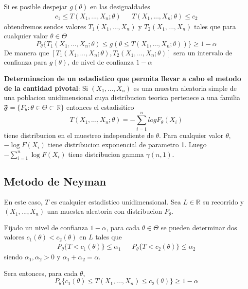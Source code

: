 \documentclass[10pt]{extarticle}
\newcommand{\R}{\mathbb{R}}
\newcommand{\<}{\langle}
\renewcommand{\>}{\rangle}
\theoremstyle{definition}
\begin{document}
Si es posible despejar $g(\theta)$ en las desigualdades
\begin{align*}
  c_1 \leq T(X_1,..., X_n; \theta) &  & T(X_1,..., X_n; \theta) \leq c_2
\end{align*}
obtendremos sendos valores $T_1(X_1,..., X_n)$ y $T_2(X_1,..., X_n)$ tales que para cualquier valor $\theta \in \Theta$
\begin{equation*}
  P_\theta \{T_1(X_1,..., X_n; \theta) \leq  g(\theta \leq T(X_1,..., X_n; \theta))\} \geq 1 - \alpha
\end{equation*}
De manera que $[T_1(X_1,..., X_n; \theta), T_2(X_1,..., X_n; \theta)]$ sera un intervalo de confianza para $g(\theta)$, de nivel de confianza $1-\alpha$

\textbf{Determinacion de un estadistico que permita llevar a cabo el metodo de la cantidad pivotal}: Si $(X_1,..., X_n)$ es una muestra aleatoria simple de una poblacion unidimensional cuya distribucion teorica pertenece a una familia $\mathfrak{F} = \{F_\theta : \theta \in \Theta \subset \R \}$ entonces el estadisitico
\begin{equation*}
  T(X_1,..., X_n; \theta)=-\sum_{i=1}^n log F_\theta (X_i)
\end{equation*}
tiene distribucion en el muestreo independiente de $\theta$. Para cualquier valor $\theta$, $-\log F(X_i)$ tiene distribucion exponencial de parametro 1. Luego $-\sum_{i=1}^n \log F(X_i)$ tiene distribucion gamma $\gamma(n, 1)$.

\subsection*{Metodo de Neyman}

En este caso, $T$ es cualquier estadistico unidimensional. Sea $L \in \R$ su recorrido y $(X_1, ..., X_n)$ una muestra aleatoria con distribucion $P_\theta$.

Fijado un nivel de confianza $1-\alpha$, para cada $\theta \in \Theta$ se pueden determinar dos valores $c_1(\theta) < c_2(\theta)$ en $L$ tales que
\begin{align*}
  P_\theta \{T < c_1(\theta)\} \leq \alpha_1 &  & P_\theta \{T < c_2(\theta)\} \leq \alpha_2
\end{align*}
siendo $\alpha_1, \alpha_2 > 0$ y $\alpha_1 + \alpha_2 = \alpha$.

Sera entonces, para cada $\theta$,
\begin{equation*}
  P_\theta \{ c_1(\theta) \leq T(X_1, ..., X_n) \leq c_2(\theta) \} \geq 1 - \alpha
\end{equation*}
\end{document}
